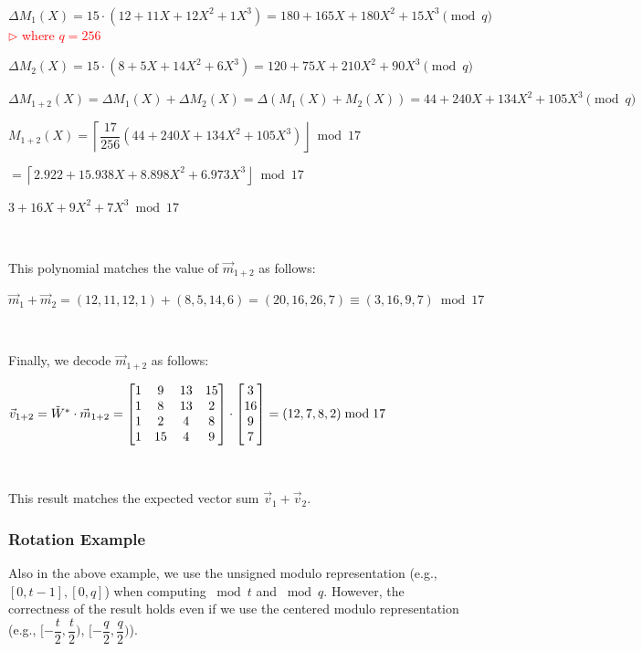 $ $

$\Delta M_1(X) = 15\cdot(12 + 11X + 12X^2 + 1X^3) = 180 + 165X + 180X^2 + 15X^3 \pmod{q}$ \textcolor{red}{  $\rhd$ where $q = 256$}

$\Delta M_2(X) = 15\cdot(8 + 5X + 14X^2 + 6X^3) = 120 + 75X + 210X^2 + 90X^3 \pmod{q}$

$\Delta M_{1+2}(X) = \Delta M_1(X) + \Delta M_2(X) = \Delta (M_1(X) + M_2(X)) = 44 + 240X + 134X^2 + 105X^3 \pmod{q}$

$M_{1+2}(X) =\left\lceil\dfrac{17}{256}(44 + 240X + 134X^2 + 105X^3)\right\rfloor \bmod 17$

$= \left\lceil2.922 + 15.938X + 8.898X^2 + 6.973X^3\right\rfloor \bmod 17$

$3 + 16X + 9X^2 + 7X^3 \bmod 17 $

$ $


This polynomial matches the value of $\vec{m}_{1+2}$ as follows:

$\vec{m}_1 + \vec{m}_2 = (12, 11, 12, 1) + (8, 5, 14, 6) = (20, 16, 26, 7) \equiv (3, 16, 9, 7) \bmod 17$

$ $

Finally, we decode $\vec{m}_{1+2}$ as follows:



$\vec{v}_{1+2} = \tilde{W}^* \cdot \vec{m}_{1+2} = \begin{bmatrix}
1 & 9 & 13 & 15\\
1 & 8 & 13 & 2\\
1 & 2 & 4 & 8\\
1 & 15 & 4 & 9\\
\end{bmatrix} \cdot \begin{bmatrix}3\\16\\9\\7\end{bmatrix} = (12, 7, 8, 2) \bmod{17}$

$ $

This result matches the expected vector sum $\vec{v}_1 + \vec{v}_2$.




\subsubsection{Rotation Example}
\label{subsubsec:bfv-rotation-ex}

Also in the above example, we use the unsigned modulo representation (e.g., $[0, t-1], [0, q]$) when computing $\bmod t$ and $\bmod q$. However, the correctness of the result holds even if we use the centered modulo representation (e.g., $[-\dfrac{t}{2}, \dfrac{t}{2})$, $[-\dfrac{q}{2}, \dfrac{q}{2})$).


